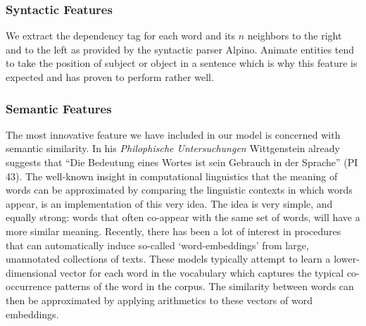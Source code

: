 \documentclass[a4paper,UKenglish]{oasics}
\begin{document}
\subsubsection{Syntactic Features}
We extract the dependency tag for each word and its $n$ neighbors to
the right and to the left as provided by the syntactic parser
Alpino. Animate entities tend to take the position of subject or
object in a sentence which is why this feature is expected and has
proven to perform rather well.


\subsubsection{Semantic Features} The most innovative feature we have
included in our model is concerned with semantic similarity. In his
\textit{Philophische Untersuchungen} Wittgenstein already suggests
that ``Die Bedeutung eines Wortes ist sein Gebrauch in der Sprache''
(PI 43). The well-known insight in computational linguistics that the
meaning of words can be approximated by comparing the linguistic
contexts in which words appear, is an implementation of this very
idea. The idea is very simple, and equally strong: words that often
co-appear with the same set of words, will have a more similar
meaning. Recently, there has been a lot of interest in procedures that
can automatically induce so-called `word-embeddings' from large,
unannotated collections of texts. These models typically attempt to
learn a lower-dimensional vector for each word in the vocabulary which
captures the typical co-occurrence patterns of the word in the
corpus. The similarity between words can then be approximated by
applying arithmetics to these vectors of word embeddings.

\end{document}
